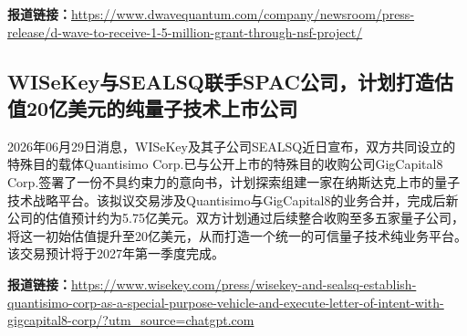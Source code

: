 \documentclass[12pt,a4paper]{ctexart}
\begin{document}
\noindent\textbf{报道链接：}\url{https://www.dwavequantum.com/company/newsroom/press-release/d-wave-to-receive-1-5-million-grant-through-nsf-project/}

\subsection{ WISeKey与SEALSQ联手SPAC公司，计划打造估值20亿美元的纯量子技术上市公司 }

2026年06月29日消息，WISeKey及其子公司SEALSQ近日宣布，双方共同设立的特殊目的载体Quantisimo Corp.已与公开上市的特殊目的收购公司GigCapital8 Corp.签署了一份不具约束力的意向书，计划探索组建一家在纳斯达克上市的量子技术战略平台。该拟议交易涉及Quantisimo与GigCapital8的业务合并，完成后新公司的估值预计约为5.75亿美元。双方计划通过后续整合收购至多五家量子公司，将这一初始估值提升至20亿美元，从而打造一个统一的可信量子技术纯业务平台。该交易预计将于2027年第一季度完成。

\noindent\textbf{报道链接：}\url{https://www.wisekey.com/press/wisekey-and-sealsq-establish-quantisimo-corp-as-a-special-purpose-vehicle-and-execute-letter-of-intent-with-gigcapital8-corp/?utm\_source=chatgpt.com}
\end{document}
